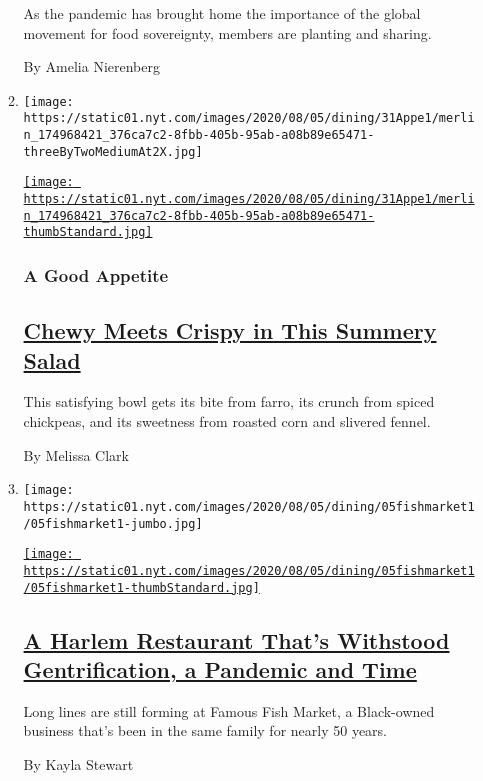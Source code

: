 \begin{enumerate}
\begin{enumerate}
    As the pandemic has brought home the importance of the global
    movement for food sovereignty, members are planting and sharing.

    By Amelia Nierenberg
  \item
    \texttt{[image: https://static01.nyt.com/images/2020/08/05/dining/31Appe1/merlin\_174968421\_376ca7c2-8fbb-405b-95ab-a08b89e65471-threeByTwoMediumAt2X.jpg]}

    \href{/2020/07/31/dining/farro-corn-chickpea-salad-recipe.html}{\texttt{[image: https://static01.nyt.com/images/2020/08/05/dining/31Appe1/merlin\_174968421\_376ca7c2-8fbb-405b-95ab-a08b89e65471-thumbStandard.jpg]}}

    \hypertarget{a-good-appetite}{%
    \subsubsection{A Good Appetite}\label{a-good-appetite}}

    \hypertarget{chewy-meets-crispy-in-this-summery-salad}{%
    \subsection{\texorpdfstring{\href{/2020/07/31/dining/farro-corn-chickpea-salad-recipe.html}{Chewy
    Meets Crispy in This Summery
    Salad}}{Chewy Meets Crispy in This Summery Salad}}\label{chewy-meets-crispy-in-this-summery-salad}}

    This satisfying bowl gets its bite from farro, its crunch from
    spiced chickpeas, and its sweetness from roasted corn and slivered
    fennel.

    By Melissa Clark
  \item
    \texttt{[image: https://static01.nyt.com/images/2020/08/05/dining/05fishmarket1/05fishmarket1-jumbo.jpg]}

    \href{/2020/07/30/dining/famous-fish-market-harlem.html}{\texttt{[image: https://static01.nyt.com/images/2020/08/05/dining/05fishmarket1/05fishmarket1-thumbStandard.jpg]}}

    \hypertarget{a-harlem-restaurant-thats-withstood-gentrification-a-pandemic-and-time}{%
    \subsection{\texorpdfstring{\href{/2020/07/30/dining/famous-fish-market-harlem.html}{A
    Harlem Restaurant That's Withstood Gentrification, a Pandemic and
    Time}}{A Harlem Restaurant That's Withstood Gentrification, a Pandemic and Time}}\label{a-harlem-restaurant-thats-withstood-gentrification-a-pandemic-and-time}}

    Long lines are still forming at Famous Fish Market, a Black-owned
    business that's been in the same family for nearly 50 years.

    By Kayla Stewart
  \end{enumerate}
\end{enumerate}


